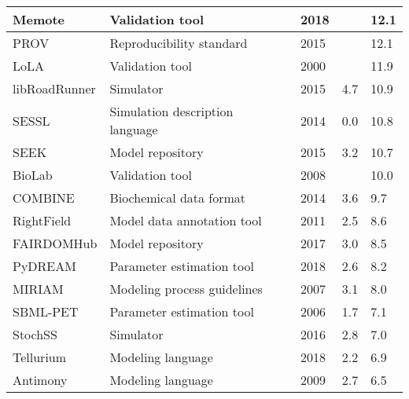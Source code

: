 \begin{longtable}{ |m{2.2cm}|m{5cm}|m{1.2cm}|m{1cm}|m{1.2cm}|m{1cm}| }
\hline
\small{Memote} &\small{Validation tool} &\cite{Lieven2018Memote:Suite} &\small{2018} &\small{} &\small{12.1}\\
\hline
\small{PROV} &\small{Reproducibility standard} &\cite{Moreau2015ThePROV} &\small{2015} &\small{} &\small{12.1}\\
\hline
\small{LoLA} &\small{Validation tool} &\cite{Schmidt2000LoLAAnalyser} &\small{2000} &\small{} &\small{11.9}\\
\hline
\small{libRoadRunner} &\small{Simulator} &\cite{Somogyi2015LibRoadRunner:Library.} &\small{2015} &\small{4.7} &\small{10.9}\\
\hline
\small{SESSL} &\small{Simulation description language} &\cite{Ewald2014SESSL:Experiments} &\small{2014} &\small{0.0} &\small{10.8}\\
\hline
\small{SEEK} &\small{Model repository} &\cite{Wolstencroft2015SEEK:Platform} &\small{2015} &\small{3.2} &\small{10.7}\\
\hline
\small{BioLab} &\small{Validation tool} &\cite{Clarke2008StatisticalPathway} &\small{2008} &\small{} &\small{10.0}\\
\hline
\small{COMBINE} &\small{Biochemical data format} &\cite{Bergmann2014COMBINEProject} &\small{2014} &\small{3.6} &\small{9.7}\\
\hline
\small{RightField} &\small{Model data annotation tool} &\cite{Wolstencroft2011RightField:Spreadsheets} &\small{2011} &\small{2.5} &\small{8.6}\\
\hline
\small{FAIRDOMHub} &\small{Model repository} &\cite{Wolstencroft2017FAIRDOMHub:Research.} &\small{2017} &\small{3.0} &\small{8.5}\\
\hline
\small{PyDREAM} &\small{Parameter estimation tool} &\cite{Shockley2018PyDREAM:Python} &\small{2018} &\small{2.6} &\small{8.2}\\
\hline
\small{MIRIAM} &\small{Modeling process guidelines} &\cite{Laibe2007MIRIAMBiology.} &\small{2007} &\small{3.1} &\small{8.0}\\
\hline
\small{SBML-PET} &\small{Parameter estimation tool} &\cite{Zi2006SBML-PET:Tool} &\small{2006} &\small{1.7} &\small{7.1}\\
\hline
\small{StochSS} &\small{Simulator} &\cite{drawert2016stochastic} &\small{2016} &\small{2.8} &\small{7.0}\\
\hline
\small{Tellurium} &\small{Modeling language} &\cite{Choi2018Tellurium:Biology} &\small{2018} &\small{2.2} &\small{6.9}\\
\hline
\small{Antimony} &\small{Modeling language} &\cite{Smith2009Antimony:Language} &\small{2009} &\small{2.7} &\small{6.5}\\

\end{longtable}
